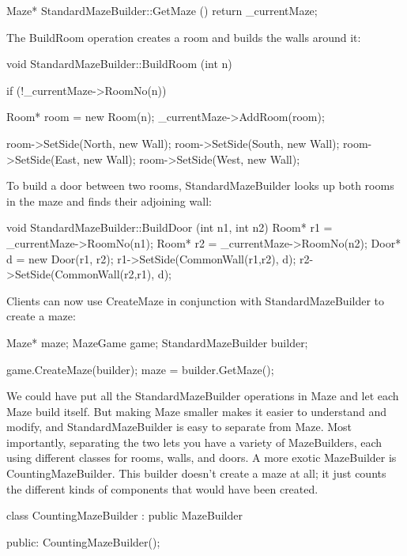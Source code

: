 \documentclass{report}
\begin{document}
\begin{itemize}
\begin{cppcode}
                    Maze* StandardMazeBuilder::GetMaze () {
                        return _currentMaze;
                    }
                \end{cppcode}
                \bigbreak \noindent 
                The BuildRoom operation creates a room and builds the walls around it:
                \bigbreak \noindent 
                \begin{cppcode}
                    void StandardMazeBuilder::BuildRoom (int n) {
                        if (!_currentMaze->RoomNo(n)) {
                            Room* room = new Room(n);
                            _currentMaze->AddRoom(room);

                            room->SetSide(North, new Wall);
                            room->SetSide(South, new Wall);
                            room->SetSide(East, new Wall);
                            room->SetSide(West, new Wall);
                        }
                    }
                \end{cppcode}
                \bigbreak \noindent 
                To build a door between two rooms, StandardMazeBuilder looks up both rooms in the maze and finds their adjoining wall:
                \bigbreak \noindent 
                \begin{cppcode}
                    void StandardMazeBuilder::BuildDoor (int n1, int n2) {
                        Room* r1 = _currentMaze->RoomNo(n1);
                        Room* r2 = _currentMaze->RoomNo(n2);
                        Door* d = new Door(r1, r2);
                        r1->SetSide(CommonWall(r1,r2), d);
                        r2->SetSide(CommonWall(r2,r1), d);
                    }
                \end{cppcode}
                \bigbreak \noindent 
                Clients can now use CreateMaze in conjunction with StandardMazeBuilder to create a maze:
                \bigbreak \noindent 
                \begin{cppcode}
                    Maze* maze;
                    MazeGame game;
                    StandardMazeBuilder builder;

                    game.CreateMaze(builder);
                    maze = builder.GetMaze();
                \end{cppcode}
                \bigbreak \noindent 
                We could have put all the StandardMazeBuilder operations in Maze and let each Maze build itself. But making Maze smaller makes it easier to understand and modify, and StandardMazeBuilder is easy to separate from Maze. Most importantly, separating the two lets you have a variety of MazeBuilders, each using different classes for rooms, walls, and doors.
                \bigbreak \noindent 
                A more exotic MazeBuilder is CountingMazeBuilder. This builder doesn't create a maze at all; it just counts the different kinds of components that would have been created.
                \bigbreak \noindent 
                \begin{cppcode}
                    class CountingMazeBuilder : public MazeBuilder {
                    public:
                        CountingMazeBuilder();

}
\end{cppcode}
\end{itemize}
\end{document}
